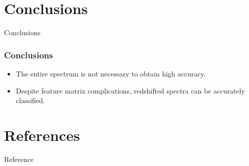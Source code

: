\documentclass[aspectratio=169]{beamer}
\begin{document}
\section{Conclusions}
\begin{frame}
\begin{center}
\LARGE
Conclusions
\end{center}

\end{frame}

\begin{frame}
\frametitle{Conclusions}
\begin{itemize}
\item The entire spectrum is not necessary to obtain high accuracy.
\item Despite feature matrix complications, redshifted spectra can be accurately classified.
\end{itemize}
\end{frame}

\section{References}
\begin{frame}[allowframebreaks]{Reference}
    
    
\end{frame}
\end{document}
